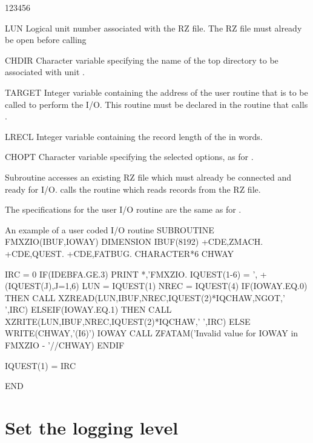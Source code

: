 \begin{DLtt}{123456}
\item[LUN]Logical unit number associated with the RZ file.
The RZ file must already be open before calling 
\item[CHDIR]Character variable specifying the name of the top directory to be
associated with unit .
\item[TARGET]Integer variable containing the address of the user
routine that is to be called to perform the I/O.
This routine must be declared  in the routine
that calls .
\item[LRECL]Integer variable containing the record length of the
 in words.
\item[CHOPT]Character variable specifying the selected options, as for
.
\end{DLtt}

Subroutine  accesses an existing RZ file which must
already be connected and ready for I/O.  calls
the routine  which reads records from the RZ file.

The specifications for the user I/O routine are the same as for
.

\begin{XMPt}{An example of a user coded I/O routine}
      SUBROUTINE FMXZIO(IBUF,IOWAY)
      DIMENSION IBUF(8192)
+CDE,ZMACH.
+CDE,QUEST.
+CDE,FATBUG.
      CHARACTER*6  CHWAY

      IRC  = 0
      IF(IDEBFA.GE.3) PRINT *,'FMXZIO. IQUEST(1-6) = ',
     +   (IQUEST(J),J=1,6)
      LUN  = IQUEST(1)
      NREC = IQUEST(4)
      IF(IOWAY.EQ.0) THEN
         CALL XZREAD(LUN,IBUF,NREC,IQUEST(2)*IQCHAW,NGOT,' ',IRC)
      ELSEIF(IOWAY.EQ.1) THEN
         CALL XZRITE(LUN,IBUF,NREC,IQUEST(2)*IQCHAW,' ',IRC)
      ELSE
         WRITE(CHWAY,'(I6)') IOWAY
         CALL ZFATAM('Invalid value for IOWAY in FMXZIO - '//CHWAY)
      ENDIF

      IQUEST(1) = IRC

      END
\end{XMPt}

\section{Set the logging level}


